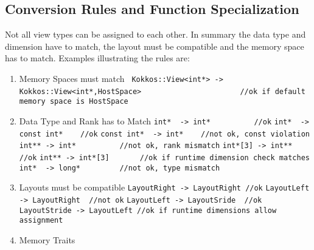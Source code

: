 \subsection{Conversion Rules and Function Specialization}

Not all view types can be assigned to each other. In summary
the data type and dimension have to match, the layout must be
compatible and the memory space has to match. Examples illustrating
the rules are:

\begin{enumerate}
\item Memory Spaces must match
  \subitem \lstinline{ Kokkos::View<int*> -> Kokkos::View<int*,HostSpace>}
  \subitem \lstinline{                      //ok if default memory space is HostSpace}
\item Data Type and Rank has to Match
\subitem \lstinline{int*  -> int*          //ok}
\subitem \lstinline{int*  -> const int*    //ok}
\subitem \lstinline{const int*  -> int*    //not ok, const violation}
\subitem \lstinline{int** -> int*          //not ok, rank mismatch}
\subitem \lstinline{int*[3] -> int**       //ok}
\subitem \lstinline{int** -> int*[3]       //ok if runtime dimension check matches}
\subitem \lstinline{int*  -> long*         //not ok, type mismatch}
\item Layouts must be compatible
\subitem \lstinline{LayoutRight -> LayoutRight //ok}
\subitem \lstinline{LayoutLeft -> LayoutRight  //not ok}
\subitem \lstinline{LayoutLeft -> LayoutSride  //ok}
\subitem \lstinline{LayoutStride -> LayoutLeft //ok if runtime dimensions allow assignment}
\item Memory Traits 
\end{enumerate}


